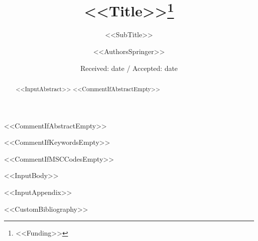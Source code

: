 \documentclass[%
nospthms,
smallextended,
envcountsect,
<<DocumentClassOptions>>]{svjour3}
\begin{document}
\title{<<Title>>\thanks{<<Funding>>}}
\subtitle{<<SubTitle>>}

\dedication{<<Dedication>>}

\author{<<AuthorsSpringer>>}

\date{Received: date / Accepted: date}

\maketitle

<<CommentIfAbstractEmpty>>\begin{abstract}
<<InputAbstract>>
<<CommentIfAbstractEmpty>>\end{abstract}

<<CommentIfKeywordsEmpty>>

<<CommentIfMSCCodesEmpty>>

<<InputBody>>

\appendix
<<InputAppendix>>


<<CustomBibliography>>
\end{document}
